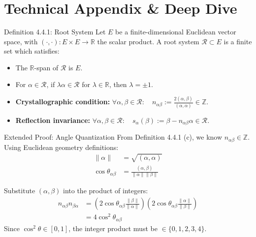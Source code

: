 \section{Technical Appendix \& Deep Dive}

\begin{frame}[label=backup_rootsystem]{Definition 4.4.1: Root System}
    Let $E$ be a finite-dimensional Euclidean vector space, with $(\cdot, \cdot) : E \times E \to \mathbb{R}$ the scalar product. A root system $\mathcal{R} \subset E$ is a finite set which satisfies:
    \begin{itemize}
        \item[a)] The $\mathbb{R}$-span of $\mathcal{R}$ is $E$.
        \item[b)] For $\alpha \in \mathcal{R}$, if $\lambda \alpha \in \mathcal{R}$ for $\lambda \in \mathbb{R}$, then $\lambda = \pm 1$.
        \item[c)] \textbf{Crystallographic condition:} $\forall \alpha, \beta \in \mathcal{R}: \quad n_{\alpha\beta} := \frac{2(\alpha, \beta)}{(\alpha, \alpha)} \in \mathbb{Z}$.
        \item[d)] \textbf{Reflection invariance:} $\forall \alpha, \beta \in \mathcal{R}: \quad s_\alpha(\beta) := \beta - n_{\alpha\beta}\alpha \in \mathcal{R}$.
    \end{itemize}
\end{frame}

\begin{frame}[label=backup_angles]{Extended Proof: Angle Quantization}
    From Definition 4.4.1 (c), we know $n_{\alpha\beta} \in \mathbb{Z}$.
    Using Euclidean geometry definitions:
    \begin{align*}
        \|\alpha\|                & = \sqrt{(\alpha, \alpha)}                      \\
        \cos \theta_{\alpha\beta} & = \frac{(\alpha, \beta)}{\|\alpha\| \|\beta\|}
    \end{align*}

    Substitute $(\alpha, \beta)$ into the product of integers:
    \begin{align*}
        n_{\alpha\beta} n_{\beta\alpha} & = \left( 2 \cos \theta_{\alpha\beta} \frac{\|\beta\|}{\|\alpha\|} \right) \left( 2 \cos \theta_{\alpha\beta} \frac{\|\alpha\|}{\|\beta\|} \right) \\
                                        & = 4 \cos^2 \theta_{\alpha\beta}
    \end{align*}
    Since $\cos^2 \theta \in [0,1]$, the integer product must be $\in \{0,1,2,3,4\}$.
\end{frame}

